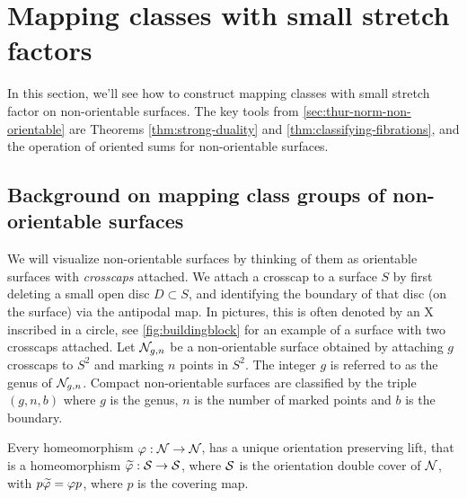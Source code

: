 \section{Mapping classes with small stretch factors}
\label{sec:mapping-classes-with}

In this section, we'll see how to construct mapping classes with small stretch factor on non-orientable surfaces.
The key tools from \autoref{sec:thur-norm-non-orientable} are Theorems \ref{thm:strong-duality} and \ref{thm:classifying-fibrations}, and the operation of oriented sums for non-orientable surfaces.

\subsection{Background on mapping class groups of non-orientable surfaces}
\label{sec:backgr-mapp-class}

We will visualize non-orientable surfaces by thinking of them as orientable surfaces with \emph{crosscaps} attached.
We attach a crosscap to a surface $S$ by first deleting a small open disc $D\subset S$, and identifying the boundary of that disc (on the surface) via the antipodal map.
In pictures, this is often denoted by an X inscribed in a circle, see \autoref{fig:buildingblock} for an example of a surface with two crosscaps attached.
Let $\mathcal{N}_{g,n}$ be a non-orientable surface obtained by attaching $g$ crosscaps to $S^2$ and marking $n$ points in $S^2$.
The integer $g$ is referred to as the genus of $\mathcal{N}_{g,n}$.
Compact non-orientable surfaces are classified by the triple $(g,n,b)$ where $g$ is the genus, $n$ is the number of marked points and $b$ is the boundary.

Every homeomorphism $\varphi: \mathcal{N} \to \mathcal{N}$, has a unique orientation preserving lift, that is a homeomorphism $\widetilde{\varphi}: \mathcal{S} \to \mathcal{S}$, where $\mathcal{S}$ is the orientation double cover of $\mathcal{N}$, with $p\widetilde{\varphi}=\varphi p$, where $p$ is the covering map.

